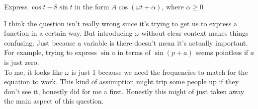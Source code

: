 \documentclass[a4paper, 12pt]{report}
\begin{document}
    \newpage
    \begin{tcolorbox}[title=\color{black}{\section{Q4}}, colback=white, colframe=black!30!white, boxrule=0.4mm, width=1\textwidth]
        Express \( \cos t-8 \sin t \) in the form \( A \cos (\omega t+\alpha) \), where \( \alpha \geq 0 \)
    \end{tcolorbox}
    \raggedright
    I think the question isn’t really wrong since it’s trying to get us to express a function in a certain way. But introducing \( \omega \) without clear context makes things confusing. Just because a variable is there doesn’t mean it’s actually important. For example, trying to express \(\sin a\) in terms of \(\sin(p + a)\) seems pointless if \(a\) is just zero.\\[1em]
    
    To me, it looks like \( \omega \) is just 1 because we need the frequencies to match for the equation to work. This kind of assumption might trip some people up if they don’t see it, honestly did for me a first. Honestly this might of just taken away the main aspect of this question.\\[4em]
\end{document}
